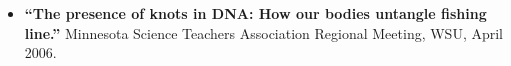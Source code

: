 \documentclass[margin,line,letterpaper]{res}
\begin{document}
\begin{resume}
\begin{itemize}
	
\item \textbf{``The presence of knots in DNA: How our bodies untangle fishing line.''}
	Minnesota Science Teachers Association Regional Meeting, WSU, April 2006.
%

\end{itemize}



\end{resume}
\end{document}
